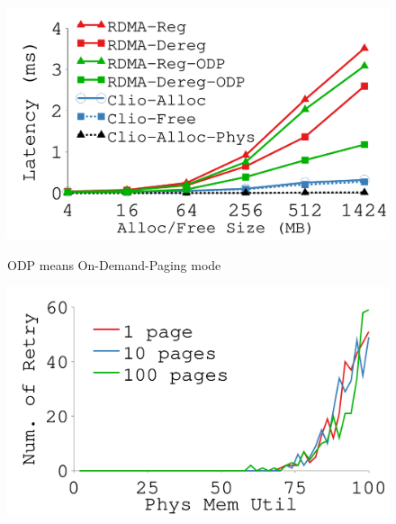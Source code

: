 {
\begin{figure}[th]
\begin{minipage}{\figWidthSix}
\begin{center}
\centerline{\includegraphics[width=\columnwidth]{Figures/g_plot_alloc_free.pdf}}
\vspace{-0.1in}
\captionsetup{width=.9\columnwidth}
{
ODP means On-Demand-Paging mode
}
\end{center}
\end{minipage}
\begin{minipage}{\figWidthSix}
\begin{center}
\centerline{\includegraphics[width=\columnwidth]{Figures/g_plot_alloc_conflict.pdf}}
\vspace{-0.1in}
\captionsetup{width=.9\columnwidth}
{
}
\end{center}
\end{minipage}

\end{figure}}
